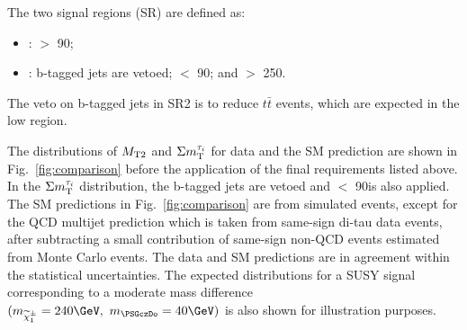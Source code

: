 The two signal regions (SR) are defined as:
\begin{itemize}
\item {\bf \binone}: \mttwo $>$ 90\GeV;
\item {\bf \bintwo}: b-tagged jets are vetoed; \mttwo $<$ 90\GeV; and \SumMT $>$ 250\GeV.
\end{itemize}
The veto on b-tagged jets in SR2 is  to reduce
$t\bar{t}$ events, which
are expected in  the low \mttwo region. %

The distributions of ${M_{\rm T2}}$ and $\Sigma m_{\rm T}^{\tau_i}$ for data and the SM prediction
are shown in Fig.~\ref{fig:comparison} before the application of the final
requirements listed above.
In the $\Sigma m_{\rm T}^{\tau_i}$ distribution, the b-tagged jets are vetoed and \mttwo $<$ 90\GeV is also applied.
The SM predictions in Fig.~\ref{fig:comparison} 
are from simulated events, except for the
QCD multijet prediction which is taken from same-sign di-tau data events,
after subtracting a small contribution of same-sign non-QCD events estimated from Monte Carlo events.
The data and SM predictions are in agreement within the statistical uncertainties.
The expected distributions for a SUSY signal 
corresponding to a moderate mass difference $(m_{\chione}=240\GeV,~m_{\PSGczDo}=40\GeV)$
is also shown for illustration purposes.

